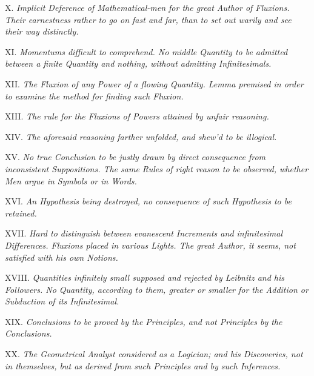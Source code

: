 \item{X.}
{\it
Implicit Deference of Mathematical-men for the great Author of
Fluxions.  Their earnestness rather to go on fast and far, than
to set out warily and see their way distinctly.}


\item{XI.}
{\it
Momentums difficult to comprehend.  No middle Quantity to be
admitted between a finite Quantity and nothing, without admitting
Infinitesimals.}

\item{XII.}
{\it
The Fluxion of any Power of a flowing Quantity.  Lemma premised
in order to examine the method for finding such Fluxion.}

\item{XIII.}
{\it
The rule for the Fluxions of Powers attained by unfair
reasoning.}

\item{XIV.}
{\it
The aforesaid reasoning farther unfolded, and shew'd to be
illogical.}


\item{XV.}
{\it
No true Conclusion to be justly drawn by direct consequence from
inconsistent Suppositions.  The same Rules of right reason to be
observed, whether Men argue in Symbols or in Words.}

\item{XVI.}
{\it
An Hypothesis being destroyed, no consequence of such Hypothesis
to be retained.}

\item{XVII.}
{\it
Hard to distinguish between evanescent Increments and
infinitesimal Differences.  Fluxions placed in various Lights.
The great Author, it seems, not satisfied with his own Notions.}

\item{XVIII.}
{\it
Quantities infinitely small supposed and rejected by
{\rm Leibnitz} and his Followers.  No Quantity, according to
them, greater or smaller for the Addition or Subduction of its
Infinitesimal.}

\item{XIX.}
{\it
Conclusions to be proved by the Principles, and not Principles by
the Conclusions.}

\item{XX.}
{\it
The Geometrical Analyst considered as a Logician; and his
Discoveries, not in themselves, but as derived from such
Principles and by such Inferences.}

